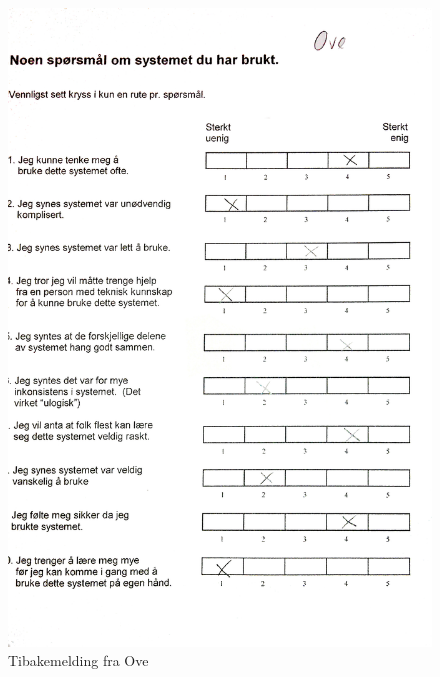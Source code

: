 \begin{figure}[ove]
\centering
\includegraphics[width=140mm]{images/tilbakemelding_ove.jpg}
\caption{Tibakemelding fra Ove}
\label{overflow}
\end{figure}